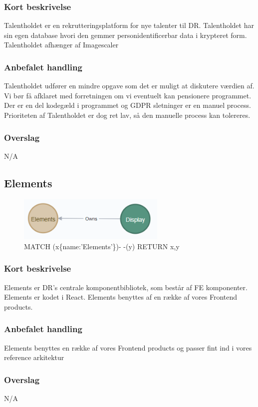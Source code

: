 \documentclass{article}
\begin{document}
\subsubsection{Kort beskrivelse}
Talentholdet er en rekrutteringsplatform for nye talenter til DR. Talentholdet har sin egen database hvori den gemmer personidentificerbar data i krypteret form. Talentholdet afhænger af Imagescaler
\subsubsection{Anbefalet handling}
Talentholdet udfører en mindre opgave som det er muligt at diskutere værdien af. Vi bør få afklaret med forretningen om vi eventuelt kan pensionere programmet. Der er en del kodegæld i programmet og GDPR sletninger er en manuel process.
Prioriteten af Talentholdet er dog ret lav, så den manuelle process kan tolereres.
\subsubsection{Overslag}
N/A

\subsection{Elements}
\begin{figure}[h]
\includegraphics[width=200pt]{Elements.PNG}
\caption{MATCH (x\{name:'Elements'\})- -(y) RETURN x,y}
\end{figure}
\subsubsection{Kort beskrivelse}
Elements er DR's centrale komponentbibliotek, som består af FE komponenter. Elements er kodet i React. Elements benyttes af en række af vores Frontend products.
\subsubsection{Anbefalet handling}
Elements benyttes en række af vores Frontend products og passer fint ind i vores reference arkitektur
\subsubsection{Overslag}
N/A
\end{document}
